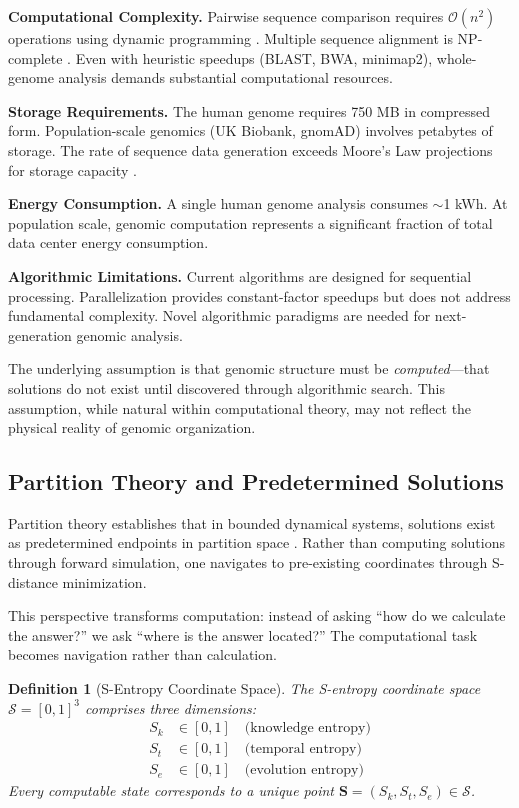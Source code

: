 \documentclass[twocolumn,10pt]{article}
\newtheorem{definition}[theorem]{Definition}
\theoremstyle{remark}
\newcommand{\Sk}{S_k}
\newcommand{\St}{S_t}
\newcommand{\Se}{S_e}
\newcommand{\Sspace}{\mathcal{S}}
\newcommand{\Scoord}{\mathbf{S}}
\newcommand{\bigO}{\mathcal{O}}
\begin{document}
\textbf{Computational Complexity.} Pairwise sequence comparison requires $\bigO(n^2)$ operations using dynamic programming \citep{smith1981identification}. Multiple sequence alignment is NP-complete \citep{wang1994complexity}. Even with heuristic speedups (BLAST, BWA, minimap2), whole-genome analysis demands substantial computational resources.

\textbf{Storage Requirements.} The human genome requires 750 MB in compressed form. Population-scale genomics (UK Biobank, gnomAD) involves petabytes of storage. The rate of sequence data generation exceeds Moore's Law projections for storage capacity \citep{stephens2015big}.

\textbf{Energy Consumption.} A single human genome analysis consumes $\sim$1 kWh. At population scale, genomic computation represents a significant fraction of total data center energy consumption.

\textbf{Algorithmic Limitations.} Current algorithms are designed for sequential processing. Parallelization provides constant-factor speedups but does not address fundamental complexity. Novel algorithmic paradigms are needed for next-generation genomic analysis.

The underlying assumption is that genomic structure must be \textit{computed}---that solutions do not exist until discovered through algorithmic search. This assumption, while natural within computational theory, may not reflect the physical reality of genomic organization.

\subsection{Partition Theory and Predetermined Solutions}

Partition theory establishes that in bounded dynamical systems, solutions exist as predetermined endpoints in partition space \citep{Sachikonye2025_Partition, poincare1890probleme}. Rather than computing solutions through forward simulation, one navigates to pre-existing coordinates through S-distance minimization.

This perspective transforms computation: instead of asking ``how do we calculate the answer?'' we ask ``where is the answer located?'' The computational task becomes navigation rather than calculation.

\begin{definition}[S-Entropy Coordinate Space]
\label{def:s_space}
The S-entropy coordinate space $\Sspace = [0,1]^3$ comprises three dimensions:
\begin{align}
\Sk &\in [0,1] \quad \text{(knowledge entropy)} \\
\St &\in [0,1] \quad \text{(temporal entropy)} \\
\Se &\in [0,1] \quad \text{(evolution entropy)}
\end{align}
Every computable state corresponds to a unique point $\Scoord = (\Sk, \St, \Se) \in \Sspace$.
\end{definition}
\end{document}
